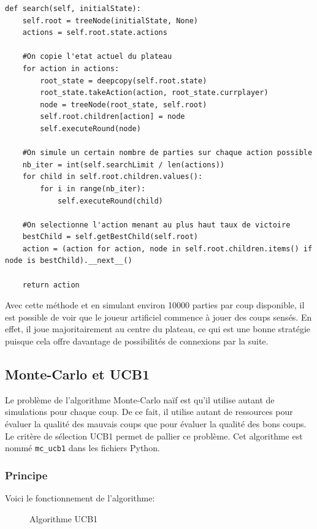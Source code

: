 \documentclass[a4paper]{article}
\theoremstyle{definition}
\begin{document}
\begin{lstlisting}
def search(self, initialState):
	self.root = treeNode(initialState, None)
	actions = self.root.state.actions
	
	#On copie l'etat actuel du plateau
	for action in actions:
		root_state = deepcopy(self.root.state)
		root_state.takeAction(action, root_state.currplayer)
		node = treeNode(root_state, self.root)
		self.root.children[action] = node
		self.executeRound(node)
		
	#On simule un certain nombre de parties sur chaque action possible
	nb_iter = int(self.searchLimit / len(actions))
	for child in self.root.children.values():
		for i in range(nb_iter):
			self.executeRound(child)
		
	#On selectionne l'action menant au plus haut taux de victoire
	bestChild = self.getBestChild(self.root)
	action = (action for action, node in self.root.children.items() if node is bestChild).__next__()
		
	return action
\end{lstlisting}

Avec cette méthode et en simulant environ 10000 parties par coup disponible, il est possible de voir que le joueur artificiel commence à jouer des coups sensés. En effet, il joue majoritairement au centre du plateau, ce qui est une bonne stratégie puisque cela offre davantage de possibilités de connexions par la suite.

\newpage 


\subsection{Monte-Carlo et UCB1}

Le problème de l'algorithme Monte-Carlo naïf est qu'il utilise autant de simulations pour chaque coup. De ce fait, il utilise autant de ressources pour évaluer la qualité des mauvais coups que pour évaluer la qualité des bons coups. Le critère de sélection UCB1 permet de pallier ce problème.
Cet algorithme est nommé \texttt{mc\_ucb1} dans les fichiers Python.

\subsubsection{Principe}

Voici le fonctionnement de l'algorithme: 

\begin{figure}[h]
	\noindent{}
	\caption{Algorithme UCB1}
\end{figure}
\end{document}
